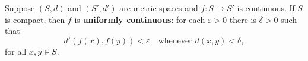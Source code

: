Suppose $(S, d)$ and $(S', d')$ are metric spaces and $f: S \to S'$ is continuous. If $S$ is compact, then $f$ is \textbf{uniformly continuous}: for each $\varepsilon > 0$ there is $\delta > 0$ such that
$$d'(f(x), f(y)) < \varepsilon \quad \text{whenever } d(x, y) < \delta,$$
for all $x, y \in S$.
